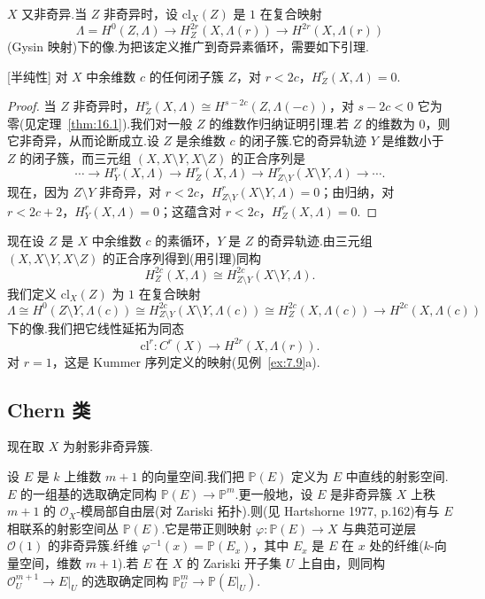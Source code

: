 $X$ 又非奇异.当 $Z$ 非奇异时，设 $\mathrm{cl}_X(Z)$ 是 $1$ 在复合映射
\[
\Lambda = H^{0}(Z, \Lambda) \to H^{2r}_{Z}(X, \Lambda(r)) \to H^{2r}(X, \Lambda(r))
\]
(Gysin 映射)下的像.为把该定义推广到奇异素循环，需要如下引理.

\begin{lemma}\label{lem:23.1}[半纯性]
对 $X$ 中余维数 $c$ 的任何闭子簇 $Z$，对 $r < 2c$，$H^{r}_{Z}(X, \Lambda) = 0$.
\end{lemma}

\begin{proof}
当 $Z$ 非奇异时，$H^{s}_{Z}(X, \Lambda) \cong H^{s-2c}(Z, \Lambda(-c))$，对 $s - 2c < 0$ 它为零(见定理~\ref{thm:16.1}).我们对一般 $Z$ 的维数作归纳证明引理.若 $Z$ 的维数为 0，则它非奇异，从而论断成立.设 $Z$ 是余维数 $c$ 的闭子簇.它的奇异轨迹 $Y$ 是维数小于 $Z$ 的闭子簇，而三元组 $(X, X \setminus Y, X \setminus Z)$ 的正合序列是
\[
\cdots \to H^{r}_{Y}(X, \Lambda) \to H^{r}_{Z}(X, \Lambda) \to H^{r}_{Z \setminus Y}(X \setminus Y, \Lambda) \to \cdots.
\]
现在，因为 $Z \setminus Y$ 非奇异，对 $r < 2c$，$H^{r}_{Z \setminus Y}(X \setminus Y, \Lambda) = 0$；由归纳，对 $r < 2c + 2$，$H^{r}_{Y}(X, \Lambda) = 0$；这蕴含对 $r < 2c$，$H^{r}_{Z}(X, \Lambda) = 0$.
\end{proof}

现在设 $Z$ 是 $X$ 中余维数 $c$ 的素循环，$Y$ 是 $Z$ 的奇异轨迹.由三元组 $(X, X \setminus Y, X \setminus Z)$ 的正合序列得到(用引理)同构
\[
H^{2c}_{Z}(X, \Lambda) \cong H^{2c}_{Z \setminus Y}(X \setminus Y, \Lambda).
\]
我们定义 $\mathrm{cl}_X(Z)$ 为 $1$ 在复合映射
\[
\Lambda \cong H^{0}(Z \setminus Y, \Lambda(c)) \cong H^{2c}_{Z \setminus Y}(X \setminus Y, \Lambda(c)) \cong H^{2c}_{Z}(X, \Lambda(c)) \to H^{2c}(X, \Lambda(c))
\]
下的像.我们把它线性延拓为同态
\[
\mathrm{cl}^{r} \colon C^{r}(X) \to H^{2r}(X, \Lambda(r)).
\]
对 $r = 1$，这是 Kummer 序列定义的映射(见例~\ref{ex:7.9}a).

\subsection*{Chern 类}

现在取 $X$ 为射影非奇异簇.

设 $E$ 是 $k$ 上维数 $m + 1$ 的向量空间.我们把 $\mathbb{P}(E)$ 定义为 $E$ 中直线的射影空间.$E$ 的一组基的选取确定同构 $\mathbb{P}(E) \to \mathbb{P}^{m}$.更一般地，设 $E$ 是非奇异簇 $X$ 上秩 $m + 1$ 的 $\mathcal{O}_X$-模局部自由层(对 Zariski 拓扑).则(见 Hartshorne 1977, p.162)有与 $E$ 相联系的射影空间丛 $\mathbb{P}(E)$.它是带正则映射 $\varphi \colon \mathbb{P}(E) \to X$ 与典范可逆层 $\mathcal{O}(1)$ 的非奇异簇.纤维 $\varphi^{-1}(x) = \mathbb{P}(E_x)$，其中 $E_x$ 是 $E$ 在 $x$ 处的纤维($k$-向量空间，维数 $m + 1$).若 $E$ 在 $X$ 的 Zariski 开子集 $U$ 上自由，则同构 $\mathcal{O}^{m+1}_{U} \to E|_{U}$ 的选取确定同构 $\mathbb{P}^{m}_{U} \to \mathbb{P}(E|_{U})$.

